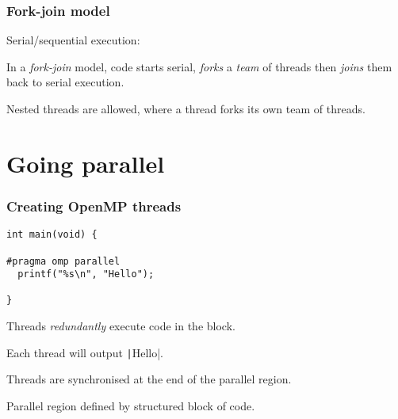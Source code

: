 \documentclass{beamer}
\begin{document}
\begin{frame}
\frametitle{Fork-join model}
Serial/sequential execution:
\begin{center}
\end{center}

\pause

In a \emph{fork-join} model, code starts serial, \emph{forks} a \emph{team} of threads then \emph{joins} them back to serial execution.
\begin{center}
\end{center}

Nested threads are allowed, where a thread forks its own team of threads.
\end{frame}

\section{Going parallel}
\begin{frame}[fragile]
\frametitle{Creating OpenMP threads}
\begin{verbatim}
int main(void) {

#pragma omp parallel
  printf("%s\n", "Hello");

}
\end{verbatim}

Threads \emph{redundantly} execute code in the block.

Each thread will output \texttt|Hello|.

Threads are synchronised at the end of the parallel region.

Parallel region defined by structured block of code.

\end{frame}
\end{document}
